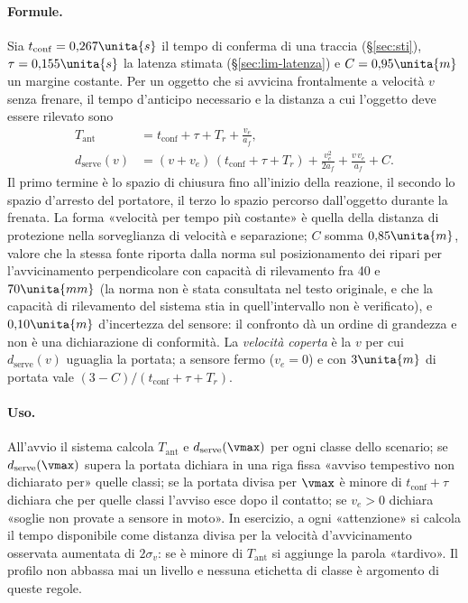 \paragraph{Formule.} Sia $t_{\mathrm{conf}}=0{,}267\unita{s}$ il tempo di conferma di una traccia (\S\ref{sec:sti}), $\tau=0{,}155\unita{s}$ la latenza stimata (\S\ref{sec:lim-latenza}) e $C=0{,}95\unita{m}$ un margine costante. Per un oggetto che si avvicina frontalmente a velocità $v$ senza frenare, il tempo d'anticipo necessario e la distanza a cui l'oggetto deve essere rilevato sono
\begin{align}
T_{\mathrm{ant}} &= t_{\mathrm{conf}}+\tau+T_r+\frac{v_e}{a_f}, \label{eq:lim-tant}\\
d_{\mathrm{serve}}(v) &= (v+v_e)\,(t_{\mathrm{conf}}+\tau+T_r)+\frac{v_e^2}{2a_f}+\frac{v\,v_e}{a_f}+C. \label{eq:lim-dserve}
\end{align}
Il primo termine è lo spazio di chiusura fino all'inizio della reazione, il secondo lo spazio d'arresto del portatore, il terzo lo spazio percorso dall'oggetto durante la frenata. La forma «velocità per tempo più costante» è quella della distanza di protezione nella sorveglianza di velocità e separazione; $C$ somma $0{,}85\unita{m}$, valore che la stessa fonte riporta dalla norma sul posizionamento dei ripari per l'avvicinamento perpendicolare con capacità di rilevamento fra 40 e $70\unita{mm}$ \cite{marvel2017} (la norma non è stata consultata nel testo originale, e che la capacità di rilevamento del sistema stia in quell'intervallo non è verificato), e $0{,}10\unita{m}$ d'incertezza del sensore: il confronto dà un ordine di grandezza e non è una dichiarazione di conformità. La \emph{velocità coperta} è la $v$ per cui $d_{\mathrm{serve}}(v)$ uguaglia la portata; a sensore fermo ($v_e=0$) e con $3\unita{m}$ di portata vale $(3-C)/(t_{\mathrm{conf}}+\tau+T_r)$.

\paragraph{Uso.} All'avvio il sistema calcola $T_{\mathrm{ant}}$ e $d_{\mathrm{serve}}(\vmax)$ per ogni classe dello scenario; se $d_{\mathrm{serve}}(\vmax)$ supera la portata dichiara in una riga fissa «avviso tempestivo non dichiarato per» quelle classi; se la portata divisa per $\vmax$ è minore di $t_{\mathrm{conf}}+\tau$ dichiara che per quelle classi l'avviso esce dopo il contatto; se $v_e>0$ dichiara «soglie non provate a sensore in moto». In esercizio, a ogni «attenzione» si calcola il tempo disponibile come distanza divisa per la velocità d'avvicinamento osservata aumentata di $2\sigma_v$: se è minore di $T_{\mathrm{ant}}$ si aggiunge la parola «tardivo». Il profilo non abbassa mai un livello e nessuna etichetta di classe è argomento di queste regole.

